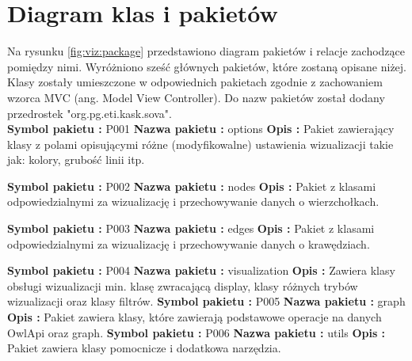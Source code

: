 

\section{Diagram klas i pakietów}
Na rysunku \figurename \space \ref{fig:viz:package} przedstawiono diagram pakietów i relacje zachodzące pomiędzy nimi. Wyróżniono sześć głównych
 pakietów, które zostaną opisane niżej.  Klasy zostały umieszczone w odpowiednich pakietach zgodnie z zachowaniem wzorca MVC (ang. Model View Controller).
Do nazw pakietów został dodany przedrostek "org.pg.eti.kask.sova". \\

\noindent 
{\bf Symbol pakietu :} P001 \newline
{\bf Nazwa pakietu :} options \newline
{\bf Opis :}  Pakiet zawierający klasy z polami opisującymi różne (modyfikowalne) ustawienia wizualizacji takie jak: kolory, grubość linii itp.  \newline

\noindent 
{\bf Symbol pakietu :} P002 \newline
{\bf Nazwa pakietu :} nodes \newline
{\bf Opis :} Pakiet z klasami odpowiedzialnymi za wizualizację i przechowywanie danych o wierzchołkach. \newline

\noindent 
{\bf Symbol pakietu :} P003 \newline
{\bf Nazwa pakietu :} edges \newline
{\bf Opis :} Pakiet z klasami odpowiedzialnymi za wizualizację i przechowywanie danych o krawędziach. \newline

\noindent 
{\bf Symbol pakietu :} P004 \newline
{\bf Nazwa pakietu :} visualization \newline
{\bf Opis :} Zawiera klasy obsługi wizualizacji min. klasę zwracającą display, klasy różnych trybów wizualizacji oraz klasy filtrów. \newline
\newline
\noindent 
{\bf Symbol pakietu :} P005 \newline
{\bf Nazwa pakietu :} graph \newline
{\bf Opis :} Pakiet zawiera klasy, które zawierają podstawowe operacje na danych OwlApi oraz graph. \newline
\newline
\noindent 
{\bf Symbol pakietu :} P006 \newline
{\bf Nazwa pakietu :} utils \newline
{\bf Opis :}  Pakiet zawiera klasy pomocnicze i dodatkowa narzędzia. \newline


